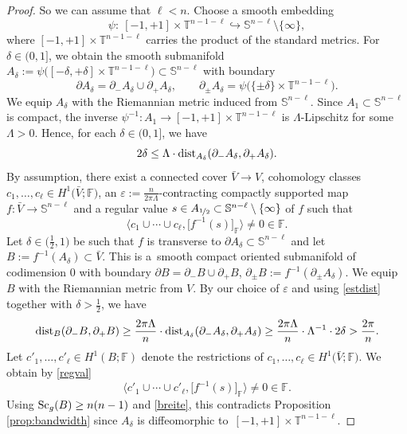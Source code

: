 \documentclass[pdftex]{sigma}
\numberwithin{equation}{section}
\newcommand{\F}{\mathbb{F}}
\newcommand{\SSS}{\mathbb{S}}
\newcommand{\TTT}{\mathbb{T}}
\newcommand{\eps}{\varepsilon}
\newcommand{\Sc}{{\rm Sc}}
\begin{document}
\begin{proof}
So we can assume that $\ell < n$.
Choose a smooth embedding
\[
 \psi \colon\ [-1,+1] \times \TTT^{n-1-\ell} \hookrightarrow \SSS^{n-\ell} \setminus \{\infty \},
\]
where $[-1,+1] \times \TTT^{n-1-\ell}$ carries the product of the standard metrics.
For $\delta \in (0,1]$, we obtain the smooth submanifold $A_\delta := \psi\big( [ - \delta , + \delta] \times \TTT^{n-1-\ell} \big) \subset \SSS^{n-\ell}$ with boundary
\[
 \partial A_\delta = \partial_- A_\delta \cup \partial_+ A_\delta , \qquad \partial_{\pm} A_\delta = \psi\big(\{ \pm \delta\} \times \TTT^{n-1-\ell}\big) .
\]
We equip $A_\delta$ with the Riemannian metric induced from $\SSS^{n-\ell}$.
Since $A_1 \subset \SSS^{n-\ell}$ is compact, the inverse $\psi^{-1} \colon A_1 \to [-1,+1] \times \TTT^{n-1-\ell}$ is $\Lambda$-Lipschitz for some $\Lambda > 0$.
Hence, for each $\delta \in (0,1]$, we have
\begin{equation} \label{estdist}
 2 \delta \leq \Lambda \cdot {\rm dist}_{A_\delta} ( \partial_- A_\delta, \partial_+ A_\delta) .
\end{equation}
By assumption, there exist a connected cover $\bar V \to V$, cohomology classes $c_1, \ldots , c_{\ell} \in H^1\big( \bar V; \F\big)$, an $\eps := \tfrac{n}{2 \pi \Lambda}$-contracting compactly supported map $f \colon \bar V \to \SSS^{n-\ell}$ and a regular value $s \in A_{\nicefrac{1}{2}} \subset \SSS^{n-\ell} \setminus \{ \infty\}$ of $f$ such that
\begin{equation} \label{regval}
 \big\langle c_1 \cup \cdots \cup c_{\ell}, \big[ f^{-1}(s) \big]_\F \big\rangle \neq 0 \in \F .
\end{equation}
Let $\delta \in \big(\tfrac{1}{2} ,1\big)$ be such that $f$ is transverse to $\partial A_\delta \subset \SSS^{n-\ell}$ and let
$
 B := f^{-1} ( A_\delta) \subset \bar V $.
This is a~smooth compact oriented submanifold of codimension $0$ with boundary
$
 \partial B = \partial_- B \cup \partial_+ B$, $ \partial_{\pm} B := f^{-1} (\partial_{\pm} A_\delta) $.
We equip $B$ with the Riemannian metric from $V$.
By our choice of $\varepsilon$ and using \eqref{estdist} together with $\delta > \tfrac{1}{2}$, we have
\begin{equation} \label{breite}
 {\rm dist}_B( \partial_- B, \partial_+ B) \geq \frac{2 \pi \Lambda}{n} \cdot {\rm dist}_{A_\delta} (\partial_- A_\delta, \partial_+ A_\delta)
 \geq \frac{2 \pi \Lambda}{n} \cdot \Lambda^{-1} \cdot 2\delta > \frac{2\pi}{n} .
\end{equation}
Let $c'_1, \ldots , c'_\ell \in H^1(B; \F)$ denote the restrictions of $c_1, \ldots , c_\ell \in H^1\big(\bar V; \F\big)$.
We obtain by \eqref{regval}
\[
 \big\langle c'_1 \cup \cdots \cup c'_{\ell}, \big[ f^{-1}(s) \big]_{\F} \big\rangle \neq 0 \in \F.
\]
Using $\Sc_g(B) \geq n(n-1)$ and \eqref{breite}, this contradicts Proposition \ref{prop:bandwidth} since $A_{\delta}$ is diffeomorphic to~${[-1, +1] \times \TTT^{n-1-\ell}}$.
\end{proof}
\end{document}

